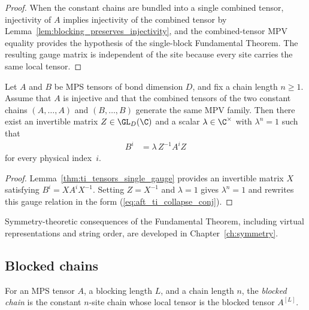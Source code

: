 \begin{proof}
    \leanok
    When the constant chains are bundled into a single combined tensor,
    injectivity of $A$ implies injectivity of the combined tensor by
    Lemma~\ref{lem:blocking_preserves_injectivity}, and the combined-tensor MPV
    equality provides the hypothesis of the single-block
    Fundamental Theorem.
    The resulting gauge matrix is independent of the site because every site
    carries the same local tensor.
\end{proof}

\begin{corollary}\label{cor:ft_ti_chain}
    \leanok
    Let $A$ and $B$ be MPS tensors of bond dimension $D$, and fix a chain
    length $n \ge 1$.
    Assume that $A$ is injective and that the combined tensors of the two
    constant chains $(A, \ldots, A)$ and $(B, \ldots, B)$ generate the same
    MPV family.
    Then there exist an invertible matrix $Z \in \GL_D(\C)$ and a scalar
    $\lambda \in \C^{\times}$ with $\lambda^n = 1$ such that
    \begin{align}
        B^i
         & =\lambda\,Z^{-1} A^i Z
        \label{eq:aft_ti_collapse_conj}
    \end{align}
    for every physical index~$i$.
\end{corollary}

\begin{proof}
    \leanok
    Lemma~\ref{thm:ti_tensors_single_gauge} provides an invertible matrix $X$ satisfying
    $B^i = X A^i X^{-1}$.
    Setting $Z = X^{-1}$ and $\lambda = 1$ gives
    $\lambda^n = 1$ and rewrites this gauge relation in the form (\ref{eq:aft_ti_collapse_conj}).
\end{proof}

\noindent Symmetry-theoretic consequences of the Fundamental Theorem,
including virtual representations and string order, are developed in
Chapter~\ref{ch:symmetry}.

\subsection{Blocked chains}

\begin{definition}
    \label{def:blocked_chain}
    \leanok
    For an MPS tensor $A$, a blocking length $L$, and a chain length $n$, the
    \emph{blocked chain} is the constant $n$-site chain whose local tensor is
    the blocked tensor $A^{[L]}$.
\end{definition}

